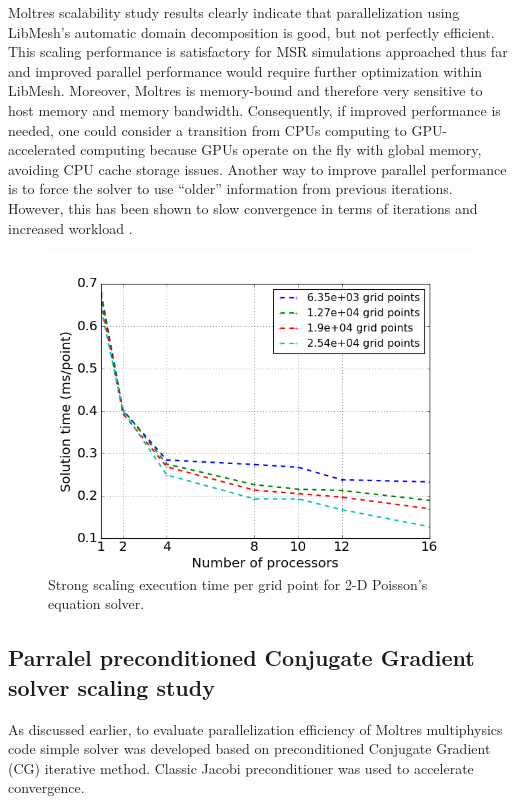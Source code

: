 \documentclass{anstrans}
\begin{document}
Moltres scalability study results clearly indicate that parallelization
using LibMesh's automatic domain decomposition is good, but not perfectly
efficient. This scaling performance is satisfactory for \gls{MSR} simulations
approached thus far and improved parallel performance would require further optimization
within LibMesh.  Moreover, Moltres is memory-bound and therefore very sensitive to host memory and memory
bandwidth. Consequently, if improved performance is needed, one could consider a transition from CPUs
computing to GPU-accelerated computing because GPUs operate on the fly with
global memory, avoiding CPU cache storage issues. Another way
to improve parallel performance is to force the solver to use
``older'' information from previous iterations. However, this has been shown to
slow convergence in terms of iterations and increased workload
\cite{satish_balay_petsc_2015}.

\begin{figure}[htpb!]
  \centering
  \includegraphics[width=\linewidth]{lapl_strong_time.png}
  \caption{Strong scaling execution time per grid point for 2-D Poisson's equation solver.}
  \label{fig:lapl_strong_time}
\end{figure}
\FloatBarrier

\subsection{Parralel preconditioned Conjugate Gradient solver scaling study}

As discussed earlier, to evaluate parallelization efficiency of Moltres multiphysics code simple solver was developed based on
preconditioned Conjugate Gradient (CG) iterative method. Classic Jacobi preconditioner was used to accelerate convergence. 
\end{document}

